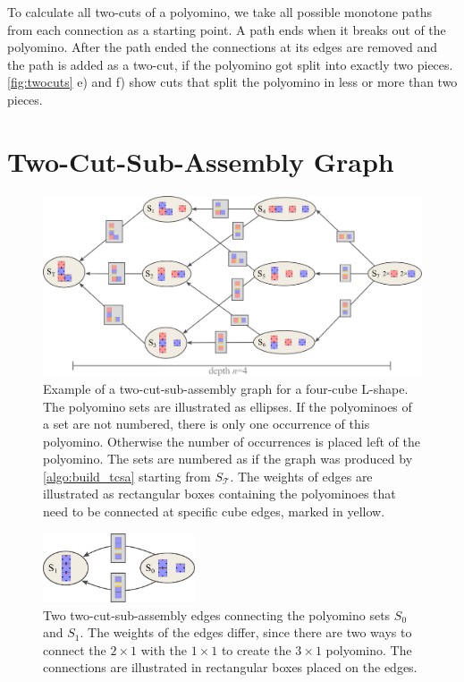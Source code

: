 To calculate all two-cuts of a polyomino, we take all possible monotone paths from each connection as a starting point.
A path ends when it breaks out of the polyomino.
After the path ended the connections at its edges are removed and the path is added as a two-cut, if the polyomino got split into exactly two pieces.
\autoref{fig:twocuts} e) and f) show cuts that split the polyomino in less or more than two pieces.


\section{Two-Cut-Sub-Assembly Graph}
\label{sec:tcsa}

\begin{figure}
	\centering
	\includegraphics[width=1\textwidth]{figures/tcsa.pdf}
	\caption[Example for a two-cut-sub-assembly graph.]{Example of a two-cut-sub-assembly graph for a four-cube L-shape. The polyomino sets are illustrated as ellipses. If the polyominoes of a set are not numbered, there is only one occurrence of this polyomino. Otherwise the number of occurrences is placed left of the polyomino. The sets are numbered as if the graph was produced by \autoref{algo:build_tcsa} starting from $S_\mathcal{T}$. The weights of edges are illustrated as rectangular boxes containing the polyominoes that need to be connected at specific cube edges, marked in yellow.}
	\label{fig:tcsa}
\end{figure}

\begin{figure}
	\centering
	\includegraphics[width=0.4\textwidth]{figures/tcsa_multiedge.pdf}
	\caption[Two two-cut-sub-assembly nodes connected with multiple edges.]{Two two-cut-sub-assembly edges connecting the polyomino sets $S_0$ and $S_1$. The weights of the edges differ, since there are two ways to connect the $2\times1$ with the $1\times1$ to create the $3\times1$ polyomino. The connections are illustrated in rectangular boxes placed on the edges.}
	\label{fig:tcsa_multiedge}
\end{figure}

